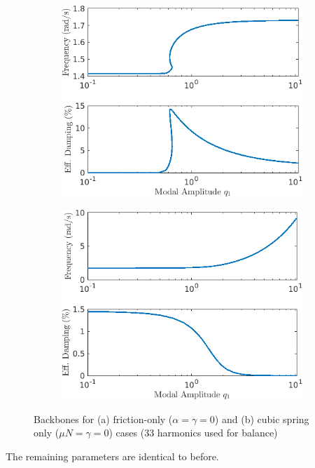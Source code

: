 \documentclass[12pt]{article}
\begin{document}
\begin{figure}[!h]
  \centering
  \begin{subfigure}{0.5\textwidth}
    \includegraphics[width=\linewidth]{FIGS/C_EPMCBB_33_P2}
    \caption{}
  \end{subfigure}%
  \begin{subfigure}{0.5\textwidth}
    \includegraphics[width=\linewidth]{FIGS/C_EPMCBB_33_P3}
    \caption{}
  \end{subfigure}  
  \caption{Backbones for (a) friction-only ($\alpha=\gamma=0$) and (b)
    cubic spring only ($\mu N=\gamma=0$) cases (33 harmonics used for
    balance)} 
\end{figure}

The remaining parameters are identical to before.
\end{document}
